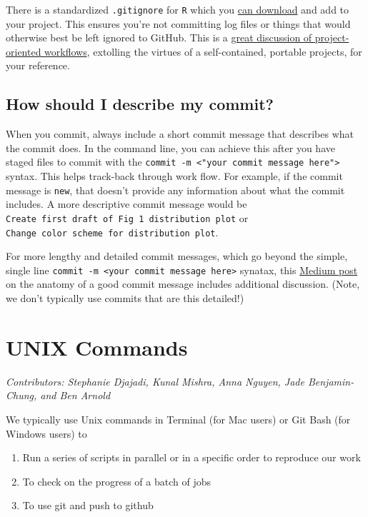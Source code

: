 \documentclass[
]{book}
\providecommand{\tightlist}{%
  \setlength{\itemsep}{0pt}\setlength{\parskip}{0pt}}
\begin{document}
There is a standardized \texttt{.gitignore} for \texttt{R} which you \href{https://github.com/github/gitignore/blob/master/R.gitignore}{can download} and add to your project. This ensures you're not committing log files or things that would otherwise best be left ignored to GitHub. This is a \href{https://www.tidyverse.org/articles/2017/12/workflow-vs-script/}{great discussion of project-oriented workflows}, extolling the virtues of a self-contained, portable projects, for your reference.

\section{How should I describe my commit?}\label{how-should-i-describe-my-commit}

When you commit, always include a short commit message that describes what the commit does. In the command line, you can achieve this after you have staged files to commit with the \texttt{commit\ -m\ \textless{}"your\ commit\ message\ here"\textgreater{}} syntax. This helps track-back through work flow. For example, if the commit message is \texttt{new}, that doesn't provide any information about what the commit includes. A more descriptive commit message would be \texttt{Create\ first\ draft\ of\ Fig\ 1\ distribution\ plot} or \texttt{Change\ color\ scheme\ for\ distribution\ plot}.

For more lengthy and detailed commit messages, which go beyond the simple, single line \texttt{commit\ -m\ \textless{}your\ commit\ message\ here\textgreater{}} synatax, this \href{https://medium.com/@andrewhowdencom/anatomy-of-a-good-commit-message-acd9c4490437}{Medium post} on the anatomy of a good commit message includes additional discussion. (Note, we don't typically use commits that are this detailed!)

\chapter{UNIX Commands}\label{unix}

\emph{Contributors: Stephanie Djajadi, Kunal Mishra, Anna Nguyen, Jade Benjamin-Chung, and Ben Arnold}

We typically use Unix commands in Terminal (for Mac users) or Git Bash (for Windows users) to

\begin{enumerate}
\def\labelenumi{\arabic{enumi}.}
\tightlist
\item
  Run a series of scripts in parallel or in a specific order to reproduce our work
\item
  To check on the progress of a batch of jobs
\item
  To use git and push to github
\end{enumerate}
\end{document}
